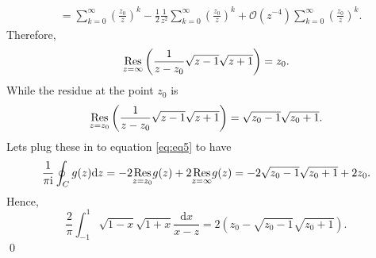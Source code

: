 \documentclass[10pt]{amsart}
\newcommand{\D}{\mathrm{d}}
\newcommand{\I}{\mathrm{i}}
\theoremstyle{nonumberplain}
\begin{document}
\begin{enumerate}[label={\bf {\arabic*}:}]
\begin{enumerate}
\begin{align*}
	&= \sum_{k = 0}^\infty \left(\frac {z_0} z\right)^k - \frac 1 2 \frac 1 {z^2} \sum_{k = 0}^\infty \left(\frac {z_0} z\right)^k + \mathcal O(z^{-4}) \sum_{k = 0}^\infty \left(\frac {z_0} z\right)^k.
\end{align*}
Therefore,
$$
\underset{z=\infty}{{\rm Res}} \left( \frac 1 {z - z_0}\sqrt {z - 1} \sqrt {z + 1} \right) = z_0.
$$
While the residue at the point $z_0$ is 
$$
\underset{z=z_0}{{\rm Res}} \left( \frac 1 {z - z_0} \sqrt {z - 1} \sqrt {z + 1} \right) = \sqrt {z_0 - 1} \sqrt {z_0 + 1}.
$$
Lets plug these in to equation \eqref{eq:eq5} to have
\begin{align*}
\frac 1 {\pi \I} \oint_C g(z) \D z
	= - 2 \underset{z=z_0}{{\rm Res}} g(z) + 2 \underset{z=\infty}{{\rm Res}} g(z)
	=  - 2 \sqrt {z_0 - 1} \sqrt {z_0 + 1} + 2z_0.
\end{align*}
Hence,
$$
\frac{2}{\pi}\int_{-1}^1 {\sqrt{1-x} \sqrt{1 + x}} \frac{\D x}{x -z} = 2 (z_0 - \sqrt {z_0 - 1} \sqrt {z_0 + 1}).
$$
\qed \\

\end{enumerate}

      
    


  
\end{enumerate}
\end{document}

